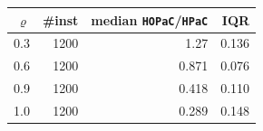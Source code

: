 \begin{tabular}{@{}rrrr@{}}
\toprule
$\varrho$ & \#inst & median \texttt{HOPaC}/\texttt{HPaC} & IQR \\
\midrule
0.3 & 1200 & 1.27 & 0.136 \\
0.6 & 1200 & 0.871 & 0.076 \\
0.9 & 1200 & 0.418 & 0.110 \\
1.0 & 1200 & 0.289 & 0.148 \\
\bottomrule
\end{tabular}

